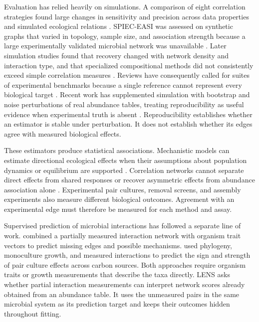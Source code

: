 \documentclass[11pt]{article}
\begin{document}
Evaluation has relied heavily on simulations.
A comparison of eight correlation strategies found large changes in sensitivity and precision across data properties and simulated ecological relations \citep{weiss2016correlation}.
SPIEC-EASI was assessed on synthetic graphs that varied in topology, sample size, and association strength because a large experimentally validated microbial network was unavailable \citep{kurtz2015spieceasi}.
Later simulation studies found that recovery changed with network density and interaction type, and that specialized compositional methods did not consistently exceed simple correlation measures \citep{hirano2019difficulty}.
Reviews have consequently called for suites of experimental benchmarks because a single reference cannot represent every biological target \citep{rottjers2018hairballs}.
Recent work has supplemented simulation with bootstrap and noise perturbations of real abundance tables, treating reproducibility as useful evidence when experimental truth is absent \citep{ghaeli2026benchmark}.
Reproducibility establishes whether an estimator is stable under perturbation.
It does not establish whether its edges agree with measured biological effects.

These estimators produce statistical associations.
Mechanistic models can estimate directional ecological effects when their assumptions about population dynamics or equilibrium are supported \citep{xiao2017networks}.
Correlation networks cannot separate direct effects from shared responses or recover asymmetric effects from abundance association alone \citep{carr2019correlation}.
Experimental pair cultures, removal screens, and assembly experiments also measure different biological outcomes.
Agreement with an experimental edge must therefore be measured for each method and assay.

Supervised prediction of microbial interactions has followed a separate line of work.
\citet{dimucci2018missing} combined a partially measured interaction network with organism trait vectors to predict missing edges and possible mechanisms.
\citet{nestor2023growth} used phylogeny, monoculture growth, and measured interactions to predict the sign and strength of pair culture effects across carbon sources.
Both approaches require organism traits or growth measurements that describe the taxa directly.
LENS asks whether partial interaction measurements can interpret network scores already obtained from an abundance table.
It uses the unmeasured pairs in the same microbial system as its prediction target and keeps their outcomes hidden throughout fitting.
\end{document}
